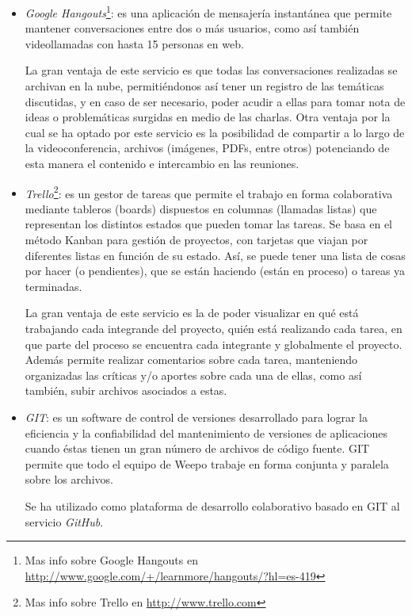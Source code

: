 \documentclass[oneside]{book}
\begin{document}
	\begin{itemize}
	\renewcommand{\labelitemi}{\scriptsize\tiny$\blacksquare$} 
	\itemsep=7pt \topsep=0pt \partopsep=0pt \parskip=0pt \parsep=0pt

		\item \textit{Google Hangouts}\footnote{Mas info sobre Google Hangouts en \url{http://www.google.com/+/learnmore/hangouts/?hl=es-419}}: es una aplicación de mensajería instantánea que permite mantener conversaciones entre dos o más usuarios, como así también videollamadas con hasta 15 personas en web. 
		\par La gran ventaja de este servicio es que todas las conversaciones realizadas se archivan en la nube, permitiéndonos así tener un registro de las temáticas discutidas, y en caso de ser necesario, poder acudir a ellas para tomar nota de ideas o problemáticas surgidas en medio de las charlas. Otra ventaja por la cual se ha optado por este servicio es la posibilidad de compartir a lo largo de la videoconferencia, archivos (imágenes, PDFs, entre otros) potenciando de esta manera el contenido e intercambio en las reuniones.

		\item \textit{Trello}\footnote{Mas info sobre Trello en \url{http://www.trello.com}}: es un gestor de tareas que permite el trabajo en forma colaborativa mediante tableros (boards) dispuestos en columnas (llamadas listas) que representan los distintos estados que pueden tomar las tareas. Se basa en el método Kanban para gestión de proyectos, con tarjetas que viajan por diferentes listas en función de su estado. Así, se puede tener una lista de cosas por hacer (o pendientes), que se están haciendo (están en proceso) o tareas ya terminadas. 
		\par La gran ventaja de este servicio es la de poder visualizar en qué está trabajando cada integrande del proyecto, quién está realizando cada tarea, en que parte del proceso se encuentra cada integrante y globalmente el proyecto. Además permite realizar comentarios sobre cada tarea, manteniendo organizadas las críticas y/o aportes sobre cada una de ellas, como así también, subir archivos asociados a estas.

		\item \textit{GIT}: es un software de control de versiones desarrollado para lograr la eficiencia y la confiabilidad del mantenimiento de versiones de aplicaciones cuando éstas tienen un gran número de archivos de código fuente. GIT permite que todo el equipo de Weepo trabaje en forma conjunta y paralela sobre los archivos.
		\par Se ha utilizado como plataforma de desarrollo colaborativo basado en GIT al servicio \textit{GitHub}.

	\end{itemize}	
\newpage
\end{document}
